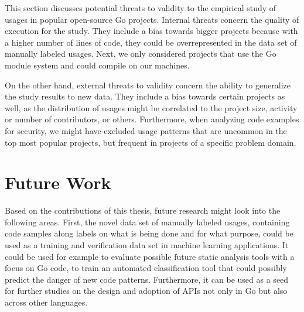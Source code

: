 This section discusses potential threats to validity to the empirical study of \unsafe{} usages in popular open-source
Go projects.
Internal threats concern the quality of execution for the study.
They include a bias towards bigger projects because with a higher number of lines of code, they could be
overrepresented in the data set of manually labeled \unsafe{} usages.
Next, we only considered projects that use the Go module system and could compile on our machines.

On the other hand, external threats to validity concern the ability to generalize the study results to new data.
They include a bias towards certain projects as well, as the distribution of \unsafe{} usages might be correlated to the
project size, activity or number of contributors, or others.
Furthermore, when analyzing \unsafe{} code examples for security, we might have excluded usage patterns that are
uncommon in the top \projsTotal{} most popular projects, but frequent in projects of a specific problem domain.



\section{Future Work}\label{sec:discussion:future-work}

Based on the contributions of this thesis, future research might look into the following areas.
First, the novel data set of manually labeled \unsafe{} usages, containing code samples along labels on what is being
done and for what purpose, could be used as a training and verification data set in machine learning applications.
It could be used for example to evaluate possible future static analysis tools with a focus on \unsafe{} Go code,
to train an automated classification tool that could possibly predict the danger of new \unsafe{} code patterns.
Furthermore, it can be used as a seed for further studies on the design and adoption of \unsafe{} APIs not only in Go
but also across other languages.

